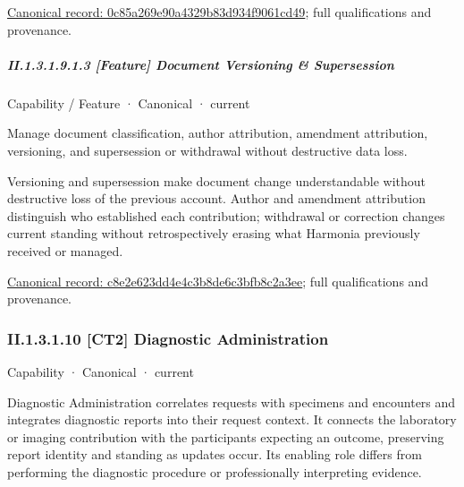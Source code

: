 {\footnotesize \href{../../../../continuum/strategy/capability/feature/0c85a269e90a4329b83d934f9061cd49.md}{Canonical record: 0c85a269e90a4329b83d934f9061cd49}; full qualifications and provenance.}\par
\subparagraph*{II.1.3.1.9.1.3 [Feature] Document Versioning \& Supersession}
\label{navigation:II.1.3.1.9.1.3}

\label{element:c8e2e623dd4e4c3b8de6c3bfb8c2a3ee}
{\small Capability / Feature · Canonical · current}\par

Manage document classification, author attribution, amendment attribution, versioning, and supersession or withdrawal without destructive data loss.



Versioning and supersession make document change understandable without destructive loss of the previous account. Author and amendment attribution distinguish who established each contribution; withdrawal or correction changes current standing without retrospectively erasing what Harmonia previously received or managed.


{\footnotesize \href{../../../../continuum/strategy/capability/feature/c8e2e623dd4e4c3b8de6c3bfb8c2a3ee.md}{Canonical record: c8e2e623dd4e4c3b8de6c3bfb8c2a3ee}; full qualifications and provenance.}\par
\subsubsection*{II.1.3.1.10 [CT2] Diagnostic Administration}
\label{navigation:II.1.3.1.10}

\label{element:3cc720ba2e8b4d7a94bb349391d61895}
{\small Capability · Canonical · current}\par

Diagnostic Administration correlates requests with specimens and encounters and integrates diagnostic reports into their request context. It connects the laboratory or imaging contribution with the participants expecting an outcome, preserving report identity and standing as updates occur. Its enabling role differs from performing the diagnostic procedure or professionally interpreting evidence.



